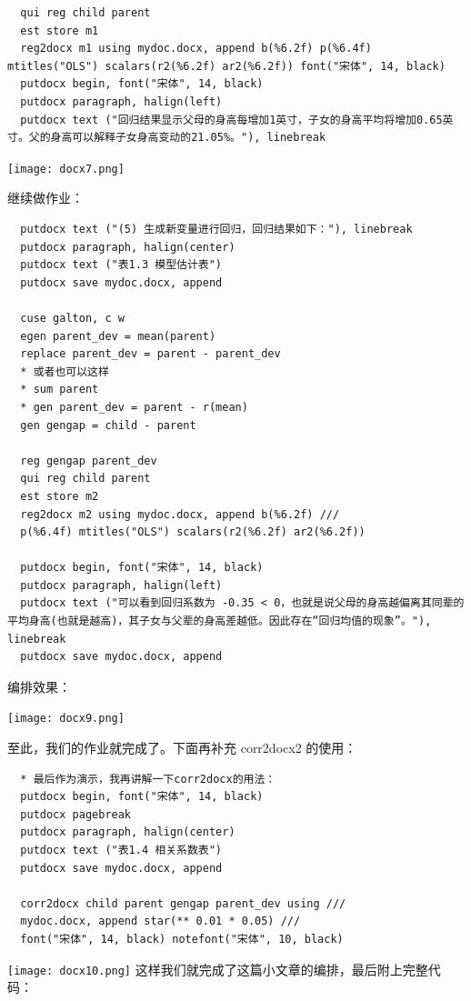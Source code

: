 \documentclass[cn,fancy,blue,11pt]{elegantbook}
\begin{document}
\begin{lstlisting}
  qui reg child parent
  est store m1
  reg2docx m1 using mydoc.docx, append b(%6.2f) p(%6.4f) mtitles("OLS") scalars(r2(%6.2f) ar2(%6.2f)) font("宋体", 14, black)
  putdocx begin, font("宋体", 14, black)
  putdocx paragraph, halign(left)
  putdocx text ("回归结果显示父母的身高每增加1英寸，子女的身高平均将增加0.65英寸。父的身高可以解释子女身高变动的21.05%。"), linebreak
\end{lstlisting}

\noindent\texttt{[image: docx7.png]}

继续做作业：

\begin{lstlisting}
  putdocx text ("(5) 生成新变量进行回归，回归结果如下："), linebreak
  putdocx paragraph, halign(center)
  putdocx text ("表1.3 模型估计表")
  putdocx save mydoc.docx, append

  cuse galton, c w
  egen parent_dev = mean(parent)
  replace parent_dev = parent - parent_dev
  * 或者也可以这样
  * sum parent
  * gen parent_dev = parent - r(mean)
  gen gengap = child - parent

  reg gengap parent_dev
  qui reg child parent
  est store m2
  reg2docx m2 using mydoc.docx, append b(%6.2f) ///
  p(%6.4f) mtitles("OLS") scalars(r2(%6.2f) ar2(%6.2f))

  putdocx begin, font("宋体", 14, black)
  putdocx paragraph, halign(left)
  putdocx text ("可以看到回归系数为 -0.35 < 0，也就是说父母的身高越偏离其同辈的平均身高(也就是越高)，其子女与父辈的身高差越低。因此存在“回归均值的现象”。"), linebreak
  putdocx save mydoc.docx, append
\end{lstlisting}

编排效果：

\noindent\texttt{[image: docx9.png]}

至此，我们的作业就完成了。下面再补充 corr2docx2 的使用：

\begin{lstlisting}
  * 最后作为演示，我再讲解一下corr2docx的用法：
  putdocx begin, font("宋体", 14, black)
  putdocx pagebreak
  putdocx paragraph, halign(center)
  putdocx text ("表1.4 相关系数表")
  putdocx save mydoc.docx, append

  corr2docx child parent gengap parent_dev using ///
  mydoc.docx, append star(** 0.01 * 0.05) ///
  font("宋体", 14, black) notefont("宋体", 10, black)
\end{lstlisting}

\noindent\texttt{[image: docx10.png]}
这样我们就完成了这篇小文章的编排，最后附上完整代码：
\end{document}
